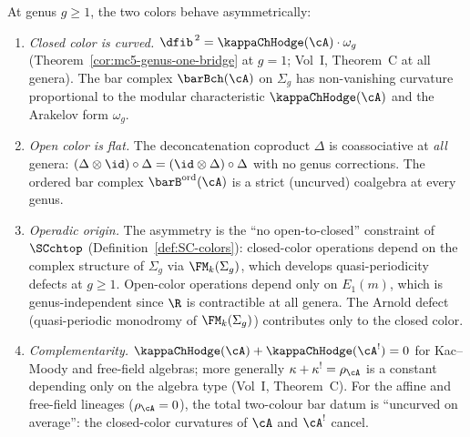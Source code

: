 \begin{theorem}
\label{thm:genus-tower-asymmetry}
At genus $g \ge 1$, the two colors behave asymmetrically:
\begin{enumerate}[label=\textup{(\roman*)}]
\item \emph{Closed color is curved.}
 $\dfib^{\,2} = \kappaChHodge(\cA) \cdot \omega_g$
 (Theorem~\ref{cor:mc5-genus-one-bridge} at $g=1$;
 Vol~I, Theorem~C at all genera). The bar complex
 $\barBch(\cA)$ on $\Sigma_g$ has non-vanishing curvature
 proportional to the modular characteristic $\kappaChHodge(\cA)$
 and the Arakelov form $\omega_g$.
\item \emph{Open color is flat.}
 The deconcatenation coproduct $\Delta$ is coassociative at
 \emph{all} genera: $(\Delta \otimes \id) \circ \Delta
 = (\id \otimes \Delta) \circ \Delta$ with no genus
 corrections. The ordered bar complex
 $\barB^{\mathrm{ord}}(\cA)$ is a strict
 (uncurved) coalgebra at every genus.
\item \emph{Operadic origin.}
 The asymmetry is the ``no open-to-closed'' constraint of
 $\SCchtop$ (Definition~\ref{def:SC-colors}): closed-color
 operations depend on the complex structure of $\Sigma_g$
 via $\FM_k(\Sigma_g)$, which develops quasi-periodicity
 defects at $g \ge 1$. Open-color operations
 depend only on $E_1(m)$, which is genus-independent since
 $\R$ is contractible at all genera. The Arnold defect
 (quasi-periodic monodromy of $\FM_k(\Sigma_g)$) contributes
 only to the closed color.
\item \emph{Complementarity.}
 $\kappaChHodge(\cA) + \kappaChHodge(\cA^!) = 0$ for Kac--Moody and
 free-field algebras; more generally
 $\kappa + \kappa^! = \rho_\cA$ is a constant depending
 only on the algebra type
 (Vol~I, Theorem~C). For the affine and free-field
 lineages ($\rho_\cA = 0$), the total
 two-colour bar datum is ``uncurved on average'': the
 closed-color curvatures of $\cA$ and $\cA^!$ cancel.
\end{enumerate}
\end{theorem}

